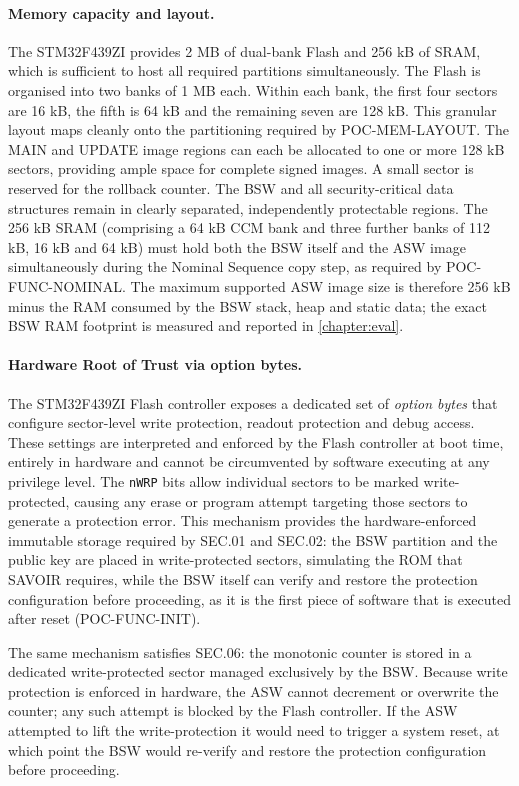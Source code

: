 \paragraph{Memory capacity and layout.} The STM32F439ZI provides 2 MB of dual-bank Flash and 256 kB of SRAM, which is sufficient to host all required partitions simultaneously. The Flash is organised into two banks of 1 MB each. Within each bank, the first four sectors are 16 kB, the fifth is 64 kB and the remaining seven are 128 kB. This granular layout maps cleanly onto the partitioning required by POC-MEM-LAYOUT. The MAIN and UPDATE image regions can each be allocated to one or more 128 kB sectors, providing ample space for complete signed images. A small sector is reserved for the rollback counter. The BSW and all security-critical data structures remain in clearly separated, independently protectable regions. The 256 kB SRAM (comprising a 64 kB CCM bank and three further banks of 112 kB, 16 kB and 64 kB) must hold both the BSW itself and the ASW image simultaneously during the Nominal Sequence copy step, as required by POC-FUNC-NOMINAL. The maximum supported ASW image size is therefore 256 kB minus the RAM consumed by the BSW stack, heap and static data; the exact BSW RAM footprint is measured and reported in \autoref{chapter:eval}.

\paragraph{Hardware Root of Trust via option bytes.} The STM32F439ZI Flash controller exposes a dedicated set of \emph{option bytes} that configure sector-level write protection, readout protection and debug access. These settings are interpreted and enforced by the Flash controller at boot time, entirely in hardware and cannot be circumvented by software executing at any privilege level. The \texttt{nWRP} bits allow individual sectors to be marked write-protected, causing any erase or program attempt targeting those sectors to generate a protection error. This mechanism provides the hardware-enforced immutable storage required by SEC.01 and SEC.02: the BSW partition and the public key are placed in write-protected sectors, simulating the ROM that SAVOIR requires, while the BSW itself can verify and restore the protection configuration before proceeding, as it is the first piece of software that is executed after reset (POC-FUNC-INIT).

The same mechanism satisfies SEC.06: the monotonic counter is stored in a dedicated write-protected sector managed exclusively by the BSW. Because write protection is enforced in hardware, the ASW cannot decrement or overwrite the counter; any such attempt is blocked by the Flash controller. If the ASW attempted to lift the write-protection it would need to trigger a system reset, at which point the BSW would re-verify and restore the protection configuration before proceeding.

